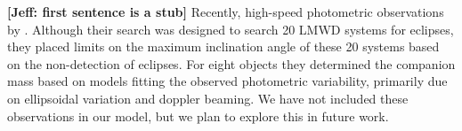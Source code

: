 \documentclass[letterpaper,12pt,preprint]{aastex}
\begin{document}
{\bf [Jeff: first sentence is a stub]} Recently, high-speed photometric observations by \citet{hermes14}. Although their search was designed to search 20 LMWD systems for eclipses, they placed limits on the maximum inclination angle of these 20 systems based on the non-detection of eclipses. For eight objects they determined the companion mass based on models fitting the observed photometric variability, primarily due on ellipsoidal variation and doppler beaming. We have not included these observations in our model, but we plan to explore this in future work.





%
% 



%
%





\end{document}
